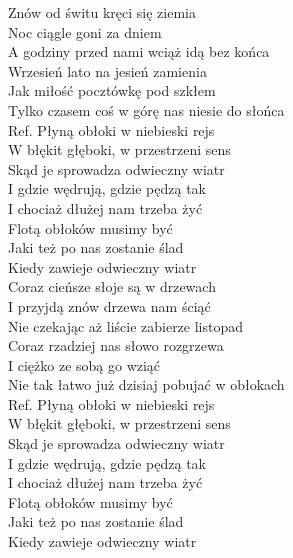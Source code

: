 
Znów od świtu kręci się ziemia \\
Noc ciągle goni za dniem \tab{}\\
A godziny przed nami wciąż idą bez końca \\
Wrzesień lato na jesień zamienia \\
Jak miłość pocztówkę pod szkłem \\
Tylko czasem coś w górę nas niesie do słońca  \\
\hops
Ref. Płyną obłoki w niebieski rejs \\
 W błękit głęboki, w przestrzeni sens \\
 Skąd je sprowadza odwieczny wiatr \\
 I gdzie wędrują, gdzie pędzą tak \\
 I chociaż dłużej nam trzeba żyć \\
 Flotą obłoków musimy być \\
 Jaki też po nas zostanie ślad \\
 Kiedy zawieje odwieczny wiatr \\
\hops
Coraz cieńsze słoje są w drzewach \\
I przyjdą znów drzewa nam ściąć \\
Nie czekając aż liście zabierze listopad \\
Coraz rzadziej nas słowo rozgrzewa \\
I ciężko ze sobą go wziąć \\
Nie tak łatwo już dzisiaj pobujać w obłokach \\
\hops
Ref. Płyną obłoki w niebieski rejs\\
 W błękit głęboki, w przestrzeni sens \\
 Skąd je sprowadza odwieczny wiatr \\
 I gdzie wędrują, gdzie pędzą tak \\
 I chociaż dłużej nam trzeba żyć \\
 Flotą obłoków musimy być \\
 Jaki też po nas zostanie ślad \\
 Kiedy zawieje odwieczny wiatr
